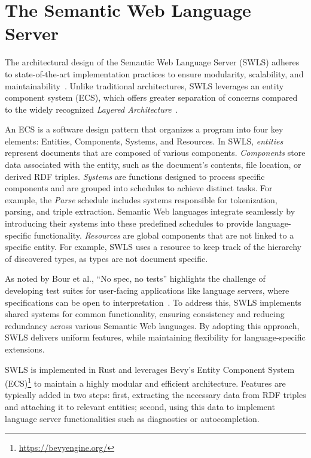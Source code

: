 \section{The Semantic Web Language Server}%
\label{sec:semantic_lsp}

The architectural design of the Semantic Web Language Server (SWLS) adheres to state-of-the-art implementation practices to ensure modularity, scalability, and maintainability~\cite{10.1145/3550355.3552452,10.1145/3563834.3567537,10.1145/3550355.3552452,Bour_2018}.
Unlike traditional architectures, SWLS leverages an entity component system (ECS), which offers greater separation of concerns compared to the widely recognized \textit{Layered Architecture}~\cite{10.1145/3550355.3552452}.

An ECS is a software design pattern that organizes a program into four key elements: Entities, Components, Systems, and Resources. 
In SWLS, \textit{entities} represent documents that are composed of various components. 
\textit{Components} store data associated with the entity, such as the document's contents, file location, or derived RDF triples. 
\textit{Systems} are functions designed to process specific components and are grouped into schedules to achieve distinct tasks. 
For example, the \textit{Parse} schedule includes systems responsible for tokenization, parsing, and triple extraction.
Semantic Web languages integrate seamlessly by introducing their systems into these predefined schedules to provide language-specific functionality.
\textit{Resources} are global components that are not linked to a specific entity.
For example, SWLS uses a resource to keep track of the hierarchy of discovered types, as types are not document specific.

As noted by Bour et al., ``No spec, no tests'' highlights the challenge of developing test suites for user-facing applications like language servers, where specifications can be open to interpretation~\cite{Bour_2018}. 
To address this, SWLS implements shared systems for common functionality, ensuring consistency and reducing redundancy across various Semantic Web languages.
By adopting this approach, SWLS delivers uniform features, while maintaining flexibility for language-specific extensions.

SWLS is implemented in Rust and leverages Bevy’s Entity Component System (ECS)\footnote{\url{https://bevyengine.org/}} to maintain a highly modular and efficient architecture.
Features are typically added in two steps:
  first, extracting the necessary data from RDF triples and attaching it to relevant entities; 
  second, using this data to implement language server functionalities such as diagnostics or autocompletion.

